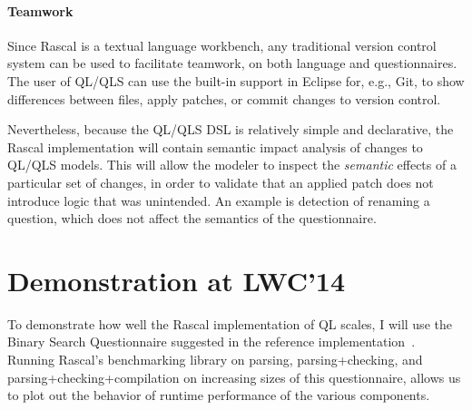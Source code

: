 \documentclass[a4paper]{article}
\begin{document}
\paragraph{Teamwork}
Since Rascal is a textual language workbench, any traditional version
control system can be used to facilitate teamwork, on both language and
questionnaires. The user of QL/QLS can use the built-in support in
Eclipse for, e.g., Git, to show differences between files, apply
patches, or commit changes to version control. 

Nevertheless, because the QL/QLS DSL is relatively simple and
declarative, the Rascal implementation will contain semantic impact
analysis of changes to QL/QLS models. This will allow the modeler to
inspect the \textit{semantic} effects of a particular set of changes,
in order to validate that an applied patch does not introduce logic
that was unintended. An example is detection of renaming a question,
which does not affect the semantics of the questionnaire.

\section{Demonstration at LWC'14}

To demonstrate how well the Rascal implementation of QL scales, I will
use the Binary Search Questionnaire suggested in the reference
implementation~\cite{ReferenceImpl}. Running Rascal's benchmarking
library on parsing, parsing+checking, and parsing+checking+compilation
on increasing sizes of this questionnaire, allows us to plot out the
behavior of runtime performance of the various components. 





\end{document}
